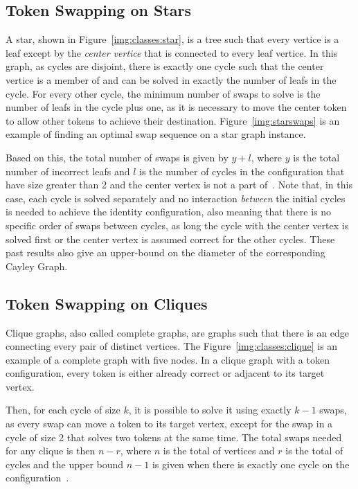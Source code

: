 \documentclass[msc]{ppgccufmg}    %
\begin{document}
\subsection{Token Swapping on Stars}
\label{sec:intro:classes_uppers:star}

A star, shown in Figure~\ref{img:classes:star}, is a tree such that every vertice
is a leaf except by the \textit{center vertice} that is connected to every leaf 
vertice.
In this graph, as cycles are disjoint, there is exactly one cycle such that
the center vertice is a member of and can be solved in exactly the number of leafs
in the cycle.
For every other cycle, the minimum number of swaps to solve is the number of
leafs in the cycle plus one, as it is necessary to move the center token to
allow other tokens to achieve their destination.
Figure~\ref{img:starswaps} is an example of finding an optimal swap sequence on 
a star graph instance.


Based on this, the total number of swaps is given by $y + l$, where $y$ is the
total number of incorrect leafs and $l$ is the number of cycles in the configuration
that have size greater than 2 and the center vertex is not a part of~\citep
{Akers:1989,Ahmad:2019}.
Note that, in this case, each cycle is solved separately and no interaction
\textit{between} the initial cycles is needed to achieve the identity configuration,
also meaning that there is no specific order of swaps between cycles, as long
the cycle with the center vertex is solved first or the center vertex is
assumed correct for the other cycles.
These past results also give an upper-bound on the diameter of the corresponding 
Cayley Graph.

\subsection{Token Swapping on Cliques}
\label{sec:intro:classes_uppers:clique}

Clique graphs, also called complete graphs, are graphs such that there is an 
edge connecting every pair of distinct vertices.
The Figure~\ref{img:classes:clique} is an example of a complete graph with
five nodes.
In a clique graph with a token configuration, every token is either already 
correct or adjacent to its target vertex.

Then, for each cycle of size $k$, it is possible to solve it using exactly
$k-1$ swaps, as every swap can move a token to its target vertex, except for
the swap in a cycle of size 2 that solves two tokens at the same time.
The total swaps needed for any clique is then $n - r$, where $n$ is the total of
vertices and $r$ is the total of cycles and the upper bound $n - 1$ is given when
there is exactly one cycle on the configuration~\citep{Kim:2016}.
\end{document}
